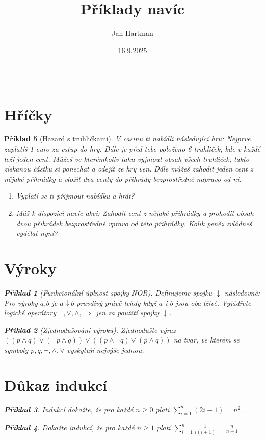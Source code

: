 \documentclass[10pt]{article}
\title{Příklady navíc}
\author{Jan Hartman}
\date{16.9.2025}
\newcommand{\titlerule}{%
    \noindent %
    \makebox[\textwidth]{\large \thetitle \hfill \thedate}
    \rule{\textwidth}{0.4pt}%
}
\theoremstyle{definitionstyle}
\theoremstyle{problemstyle}
\newtheorem{problem}{Příklad}
\begin{document}
\titlerule

\section{Hříčky}

\begin{problem}[Hazard s truhličkami]
V casinu ti nabídli následující hru: Nejprve zaplatíš 1 euro za vstup do hry. Dále je před tebe položeno 6 truhliček, kde v každé leží jeden cent. Můžeš ve kterémkoliv tahu vyjmout obsah všech truhliček, takto získanou částku si ponechat a odejít ze hry ven. Dále můžeš zahodit jeden cent z nějaké přihrádky a vložit dva centy do přihrády bezprostředně napravo od ní.

\begin{enumerate}[label=(\alph*)]
\item Vyplatí se ti přijmout nabídku a hrát?
\item Máš k dispozici navíc akci: Zahodit cent z nějaké přihrádky a prohodit obsah dvou přihrádek bezprostředně vpravo od této přihrádky. Kolik peněz zvládneš vydělat nyní?
\end{enumerate}

\section{Výroky}

\begin{problem}[Funkcionální úplnost spojky NOR]
Definujeme spojku $\downarrow$ následovně: Pro výroky $a$,$b$ je $a \downarrow b$ pravdivý právě tehdy když $a$ i $b$ jsou oba lživé. Vyjádřete logické operátory $\neg, \vee, \wedge, \Rightarrow$ jen za použití spojky $\downarrow$. 
\end{problem}

\begin{problem}[Zjednodušování výroků]
Zjednodušte výraz $((p \wedge q) \vee (\neg p \wedge q) ) \vee ( (p \wedge \neg q) \vee (p \wedge q)  )$ na tvar, ve kterém se symboly $p,q,\neg,\wedge,\vee$ vyskytují nejvýše jednou.
\end{problem}

\section{Důkaz indukcí}

\begin{problem}
Indukcí dokažte, že pro každé $n \geq 0$ platí $\sum_{i=1}^{n}(2i-1) = n^2$.
\end{problem}

\begin{problem}
Dokažte indukcí, že pro každé $n \geq 1$ platí $\sum_{i=1}^{n}\frac{1}{i(i+1)} = \frac{n}{n+1}$
\end{problem}

\end{problem}
\end{document}
